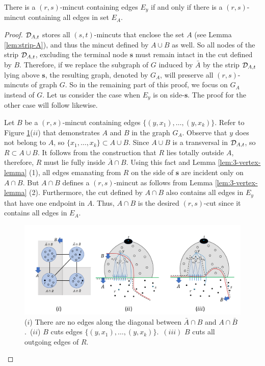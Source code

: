 \begin{lemma}
\label{lem:query-transformation}
\noindent
There is a $(r,s)$-mincut containing edges $E_y$ if and only if there is a $(r,s)$-mincut containing all edges in set $E_A$. 
\end{lemma}
\begin{proof}
${\cal D}_{A,t}$ stores all $(s,t)$-mincuts that enclose the set $A$ (see Lemma \ref{lem:strip-A}), and thus the mincut defined by $A\cup B$ as well. So all nodes of the strip ${\cal D}_{A,t}$, excluding the terminal node ${\mathbf{s}}$ must remain intact in the cut defined by $B$. Therefore, if we replace the subgraph of $G$ induced by $\bar{A}$ by the strip ${\cal D}_{A,t}$ lying above ${\mathbf{s}}$, the resulting graph, denoted by $G_A$, will preserve all $(r,s)$-mincuts of graph $G$. So in the remaining part of this proof, %
we focus on $G_A$ instead of $G$. 
Let us consider the case when $E_y$ is on side-$\mathbf{s}$.
The proof for the other case will follow likewise.

Let $B$ be a $(r,s)$-mincut containing edges $\{(y,x_1),\ldots,(y,x_k)\}$.
Refer to Figure \ref{fig:B-crosses-A}($ii$) that demonstrates $A$ and $B$ in the graph $G_A$.
Observe that $y$ does not belong to $A$, so $\{x_1,\ldots,x_k\}\subset A\cup B$.
Since $A\cup B$ is a transversal in ${\cal D}_{A,t}$, so $R\subset A\cup B$. It follows from the construction that $R$ lies totally outside $A$, therefore, $R$ must lie fully inside $\bar{A}\cap B$. Using this fact and Lemma \ref{lem:3-vertex-lemma} (1), all edges emanating from $R$ on the side of $\mathbf{s}$
are incident only on $A\cap B$. But $A\cap B$ defines a $(r,s)$-mincut as follows from Lemma \ref{lem:3-vertex-lemma} (2). 
Furthermore, the cut defined by $A\cap B$ also contains all edges in $E_y$ that have one endpoint in $A$.
Thus, $A\cap B$ is the desired $(r,s)$-cut since it contains all edges in $E_A$.
\begin{figure}[ht]
    \centering
    \includegraphics[width=\textwidth]{src/images/compressed-image-i-ii.pdf}{}
    \caption{($i$) There are no edges along the diagonal between $\bar{A}\cap {B}$ and $A\cap \bar{B}$.~($ii$) $B$ cuts edges $\{(y,x_1),\ldots,(y,x_k)\}$.~$(iii)$ $B$ cuts all outgoing edges of $R$.}
    \label{fig:B-crosses-A}
\end{figure}


\end{proof}
